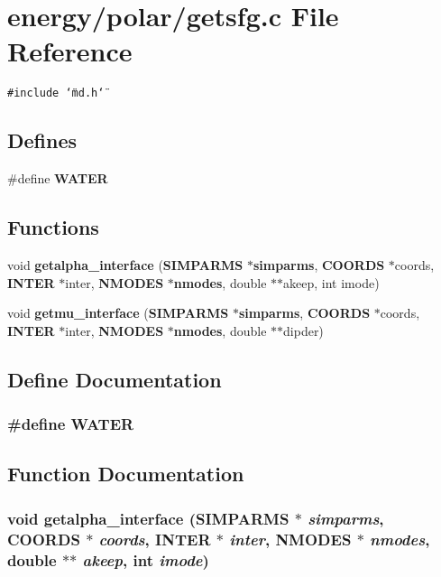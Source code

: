 \section{energy/polar/getsfg.c File Reference}
\label{getsfg_8c}
{\tt \#include \char`\"{}md.h\char`\"{}}\par
\subsection*{Defines}
\begin{CompactItemize}
\item 
\#define {\bf WATER}
\end{CompactItemize}
\subsection*{Functions}
\begin{CompactItemize}
\item 
void {\bf getalpha\_\-interface} ({\bf SIMPARMS} $\ast${\bf simparms}, {\bf COORDS} $\ast$coords, {\bf INTER} $\ast$inter, {\bf NMODES} $\ast${\bf nmodes}, double $\ast$$\ast$akeep, int imode)
\item 
void {\bf getmu\_\-interface} ({\bf SIMPARMS} $\ast${\bf simparms}, {\bf COORDS} $\ast$coords, {\bf INTER} $\ast$inter, {\bf NMODES} $\ast${\bf nmodes}, double $\ast$$\ast$dipder)
\end{CompactItemize}


\subsection{Define Documentation}
\subsubsection{\setlength{\rightskip}{0pt plus 5cm}\#define WATER}\label{getsfg_8c_5c3fbf45abc4ee50d118d87aecfee212}




\subsection{Function Documentation}
\subsubsection{\setlength{\rightskip}{0pt plus 5cm}void getalpha\_\-interface ({\bf SIMPARMS} $\ast$ {\em simparms}, {\bf COORDS} $\ast$ {\em coords}, {\bf INTER} $\ast$ {\em inter}, {\bf NMODES} $\ast$ {\em nmodes}, double $\ast$$\ast$ {\em akeep}, int {\em imode})}\label{getsfg_8c_79ede89c8a7cbbc0f4aa2ffb3e0a5cc3}



